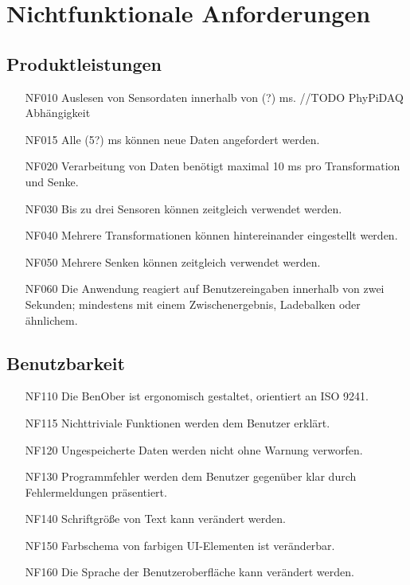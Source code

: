 \documentclass[parskip=full]{scrartcl}
\begin{document}
\section{Nichtfunktionale Anforderungen}\label{nichtfunktionale}

\subsection{Produktleistungen}

\begin{itemize}

\item[NF010] Auslesen von Sensordaten innerhalb von (?) ms. //TODO PhyPiDAQ Abhängigkeit
\item[NF015] Alle (5?) ms können neue Daten angefordert werden.
\item[NF020] Verarbeitung von Daten benötigt maximal 10 ms pro Transformation und Senke.
\item[NF030] Bis zu drei Sensoren können zeitgleich verwendet werden.
\item[NF040] Mehrere Transformationen können hintereinander eingestellt werden.
\item[NF050] Mehrere Senken können zeitgleich verwendet werden.
\item[NF060] Die Anwendung reagiert auf Benutzereingaben innerhalb von zwei Sekunden; mindestens mit einem Zwischenergebnis, Ladebalken oder ähnlichem.

\end{itemize}

\subsection{Benutzbarkeit}

\begin{itemize}

\item[NF110] Die \gls{BenOber} ist ergonomisch gestaltet, orientiert an ISO 9241.
\item[NF115] Nichttriviale Funktionen werden dem Benutzer erklärt.
\item[NF120] Ungespeicherte Daten werden nicht ohne Warnung verworfen.
\item[NF130] Programmfehler werden dem Benutzer gegenüber klar durch Fehlermeldungen präsentiert.
\item[NF140] Schriftgröße von Text kann verändert werden.
\item[NF150] Farbschema von farbigen \gls{UI}-Elementen ist veränderbar.
\item[NF160] Die Sprache der Benutzeroberfläche kann verändert werden.

\end{itemize}
\end{document}
